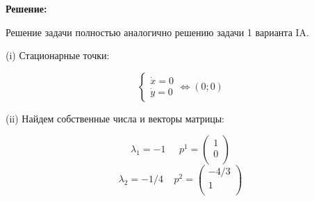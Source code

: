 \documentclass[a4paper, 12pt]{article}
\begin{document}
\textbf{Решение:} \par
Решение задачи полностью аналогично решению задачи 1 варианта IA.  

(i) Стационарные точки:

\[
\left\{
\begin{array}{lr}
\dot{x} = 0\\
\dot{y} = 0
\end{array}
\right.
\Leftrightarrow (0;0)
\]


(ii) Найдем собственные числа и векторы матрицы:

\[\lambda_1 = -1\;\;\;\;\; p^1=
\left(
\begin{array}{cc}
1\\
0\\
\end{array}
\right)  
\]
\[\lambda_2=-1/4\;\;\;\; p^2=
\left(
\begin{array}{cc}
-4/3\\
1\\
\end{array}
\right) 
\]
\end{document}
